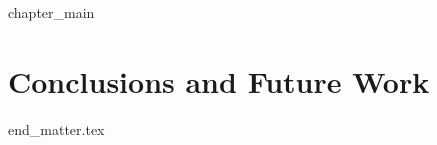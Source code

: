 \documentclass[cover]{dissertation}
\begin{document}




\ifchapeight
    {chapter_main}
\else
    \chapter{Conclusions and Future Work}
    \label{chapter:conclusions}
\fi
 

\thumbfalse
\FloatBarrier

{end_matter.tex}
\end{document}
